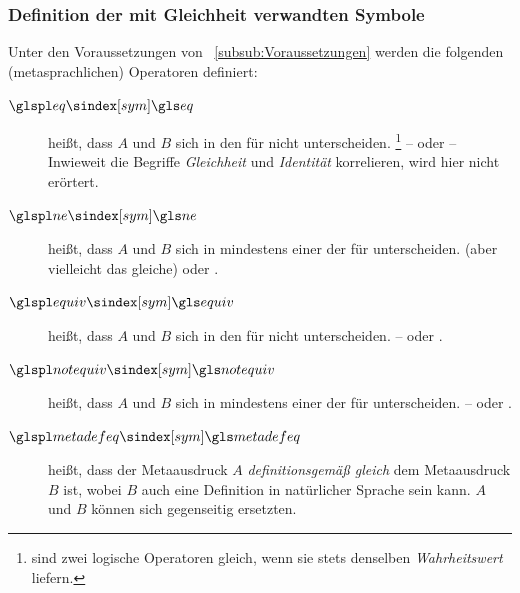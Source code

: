 \subsubsection{Definition der mit Gleichheit verwandten Symbole}
\label{subsub:DefinitionGleichheit}

Unter den Voraussetzungen von \subsubsectionname~\vref{subsub:Voraussetzungen} werden die folgenden (metasprachlichen) Operatoren definiert:
\begin{description}

	\item[$\glsSym{eq}$~~\emph{}]\label{def:Gleichheit}
	 heißt, dass $A$ und $B$ sich in den  für \symqt{$=$} nicht unterscheiden.%
	\footnote{%
		\textZB sind zwei logische Operatoren gleich, wenn sie stets denselben \emph{\gls{Wahrheitswert}} liefern.
	}
	--  oder 
	-- Inwieweit die Begriffe \emph{Gleichheit} und \emph{Identität} korrelieren, wird hier nicht erörtert. \seename~\cite{bib:Identitaet}

	\item[$\glsSym{ne}$~~\emph{}]\label{def:Ungleichheit}
	 heißt, dass $A$ und $B$ sich in mindestens einer der  für \symqt{$=$} unterscheiden.  (aber vielleicht das gleiche) oder .

	\item[$\glsSym{equiv}$~~\emph{}]\label{def:Äquivalenz}
	 heißt, dass $A$ und $B$ sich in den  für \symqt{$\equiv$} nicht unterscheiden.
	--  oder .

	\item[$\glsSym{notequiv}$~~\emph{}]\label{def:Kontravalenz}
	 heißt, dass $A$ und $B$ sich in mindestens einer der  für \symqt{$\notequiv$} unterscheiden.
	--  oder .

	\item[$\glsSym{metadefeq}$~\emph{}]\label{def:Metadefinition}
	 heißt, dass der Metaausdruck $A$ \emph{definitionsgemäß gleich} dem Metaausdruck $B$ ist, wobei $B$ auch eine Definition in natürlicher Sprache sein kann.
	$A$ und $B$ können sich gegenseitig ersetzten.


\end{description}
